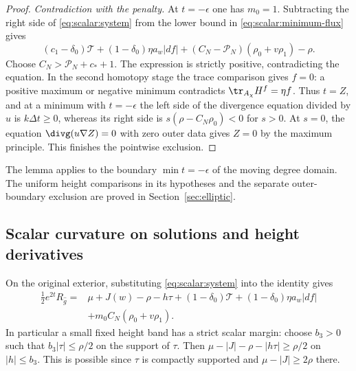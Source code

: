 \begin{proof}
\emph{Contradiction with the penalty.} At $t=-\epsilon$ one has
$m_0=1$.  Subtracting the right side of
\eqref{eq:scalar:system} from the lower bound in
\eqref{eq:scalar:minimum-flux} gives
\[
 (c_1-\delta_0)\mathcal T+(1-\delta_0)\eta a_w|df|
        +(C_N-\mathcal P_N)(\rho_0+v\rho_1)-\rho.
\]
Choose $C_N>\mathcal P_N+c_*+1$.  The expression is strictly
positive, contradicting the equation.  In the second homotopy stage
the trace comparison gives $f=0$: a positive maximum or negative
minimum contradicts $\tr_{A_\chi}H^f=\eta f$.
Thus $t=Z$, and at a minimum with $t=-\epsilon$ the left side of the
divergence
equation divided by $u$ is $k\Delta t\geq0$, whereas its right side
is $s(\rho-C_N\rho_0)<0$ for $s>0$.  At $s=0$, the equation
$\divg(u\nabla Z)=0$ with zero outer data gives $Z=0$ by the maximum
principle.  This finishes the pointwise exclusion.
\end{proof}

The lemma applies to the boundary $\min t=-\epsilon$ of the moving
degree domain.  The uniform height comparisons in its hypotheses and
the separate outer-boundary exclusion are proved in
Section~\ref{sec:elliptic}.

\subsection{Scalar curvature on solutions and height derivatives}

On the original exterior, substituting
\eqref{eq:scalar:system} into the identity gives
\begin{equation}
 \begin{aligned}
 \frac12e^{2t}R_{\widehat g}
  ={}&\mu+J(w)-\rho-h\tau
       +(1-\delta_0)\mathcal T
       +(1-\delta_0)\eta a_w|df|\\
    &+m_0C_N(\rho_0+v\rho_1).
 \end{aligned}
 \label{eq:scalar:solution-curvature}
\end{equation}
In particular a small fixed height band has a strict scalar margin:
choose $b_3>0$ such that $b_3|\tau|\leq\rho/2$ on the support of
$\tau$.  Then $\mu-|J|-\rho-|h\tau|\geq\rho/2$ on
$|h|\leq b_3$.  This is possible since $\tau$ is compactly supported
and $\mu-|J|\geq2\rho$ there.

